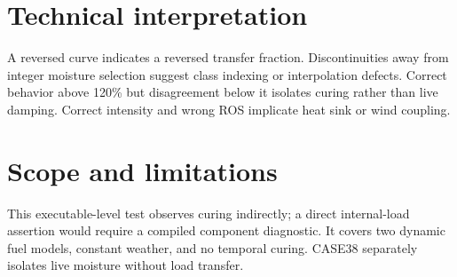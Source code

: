 \section{Technical interpretation}
A reversed curve indicates a reversed transfer fraction.  Discontinuities away from integer moisture selection suggest class indexing or interpolation defects.  Correct behavior above 120\% but disagreement below it isolates curing rather than live damping.  Correct intensity and wrong ROS implicate heat sink or wind coupling.

\section{Scope and limitations}
This executable-level test observes curing indirectly; a direct internal-load assertion would require a compiled component diagnostic.  It covers two dynamic fuel models, constant weather, and no temporal curing.  CASE38 separately isolates live moisture without load transfer.
